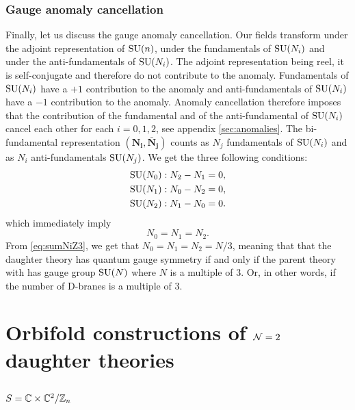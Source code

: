 \documentclass[a4paper,10pt]{article}
\begin{document}
        \subsubsection{Gauge anomaly cancellation}
        
            Finally, let us discuss the gauge anomaly cancellation. Our fields transform under the adjoint representation of $\text{SU}(n)$, under the fundamentals of $\text{SU}(N_i)$ and under the anti-fundamentals of $\text{SU}(N_i)$. The adjoint representation being reel, it is self-conjugate and therefore do not contribute to the anomaly. Fundamentals of $\text{SU}(N_i)$ have a $+1$ contribution to the anomaly and anti-fundamentals of $\text{SU}(N_i)$ have a $-1$ contribution to the anomaly. Anomaly cancellation therefore imposes that the contribution of the fundamental and of the anti-fundamental of $\text{SU}(N_i)$ cancel each other for each $i=0,1,2$, see appendix \eqref{sec:anomalies}. The bi-fundamental representation $(\boldsymbol{\textbf{N}_i},\boldsymbol{\bar{\textbf{N}}_j})$ counts as $N_j$ fundamentals of $\text{SU}(N_i)$ and as $N_i$ anti-fundamentals $\text{SU}(N_j)$. We get the three following conditions:
            \begin{align}
                \text{SU}(N_0) &: N_2-N_1 = 0,\\
                \text{SU}(N_1) &: N_0-N_2 = 0,\\
                \text{SU}(N_2) &: N_1-N_0 = 0.
            \end{align}
            which immediately imply
            \begin{equation}
                N_0=N_1=N_2.
            \end{equation}
            From \eqref{eq:sumNiZ3}, we get that $N_0=N_1=N_2=N/3$, meaning that that the daughter theory has quantum gauge symmetry if and only if the parent theory with has gauge group $\text{SU}(N)$ where $N$ is a multiple of $3$. Or, in other words, if the number of D-branes is a multiple of $3$.

\section{Orbifold constructions of $\mathcal{N}=2$ daughter theories}


    \subsection{$S=\mathbb{C}\times\mathbb{C}^2/\mathbb{Z}_n$}
\end{document}
